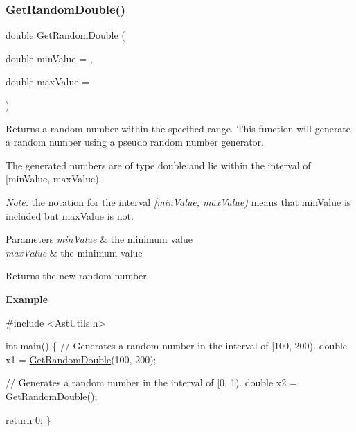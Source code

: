 \subsubsection{\texorpdfstring{Get\+Random\+Double()}{GetRandomDouble()}}
{\footnotesize\ttfamily double Get\+Random\+Double (\begin{DoxyParamCaption}\item[{double}]{min\+Value = {},  }\item[{double}]{max\+Value = {} }\end{DoxyParamCaption})}

Returns a random number within the specified range. This function will generate a random number using a pseudo random number generator.

The generated numbers are of type {\ttfamily double} and lie within the interval of \mbox{[}min\+Value, max\+Value).

{\itshape Note\+:} the notation for the interval {\itshape \mbox{[}min\+Value, max\+Value)} means that {\ttfamily min\+Value} is included but {\ttfamily max\+Value} is not.


\begin{DoxyParams}{Parameters}
{\em min\+Value} & the minimum value \\
\hline
{\em max\+Value} & the minimum value \\
\hline
\end{DoxyParams}
\begin{DoxyReturn}{Returns}
the new random number
\end{DoxyReturn}
{\bfseries Example}


\begin{DoxyCode}
\textcolor{preprocessor}{#include <AstUtils.h>}

\textcolor{keywordtype}{int} main()
\{
  \textcolor{comment}{// Generates a random number in the interval of [100, 200).}
  \textcolor{keywordtype}{double} x1 = \hyperlink{group__math__group_ga298f9ccec14d3ea06c05ccd1e1e062ac}{GetRandomDouble}(100, 200);

  \textcolor{comment}{// Generates a random number in the interval of [0, 1).}
  \textcolor{keywordtype}{double} x2 = \hyperlink{group__math__group_ga298f9ccec14d3ea06c05ccd1e1e062ac}{GetRandomDouble}();

  \textcolor{keywordflow}{return} 0;
\}
\end{DoxyCode}
 \mbox{\label{group__math__group_gab82c25b1da5feec79806fe080becf2c3}} 
